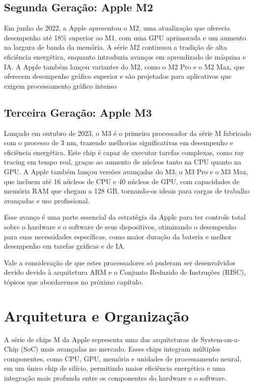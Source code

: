 \documentclass[a4paper,times,12pt]{article}
\begin{document}
\subsection{Segunda Geração: Apple M2}
\hspace{+15pt} 
Em junho de 2022, a Apple apresentou o M2, uma atualização que oferecia desempenho até 18\% superior ao M1, com uma GPU aprimorada e um aumento na largura de banda da memória. A série M2 continuou a tradição de alta eficiência energética, enquanto introduzia avanços em aprendizado de máquina e IA. A Apple também lançou variantes do M2, como o M2 Pro e o M2 Max, que oferecem desempenho gráfico superior e são projetados para aplicativos que exigem processamento gráfico intenso
\subsection{Terceira Geração: Apple M3}
\hspace{+15pt}
Lançado em outubro de 2023, o M3 é o primeiro processador da série M fabricado com o processo de 3 nm, trazendo melhorias significativas em desempenho e eficiência energética. Este chip é capaz de executar tarefas complexas, como ray tracing em tempo real, graças ao aumento de núcleos tanto na CPU quanto na GPU. A Apple também lançou versões avançadas do M3, o M3 Pro e o M3 Max, que incluem até 16 núcleos de CPU e 40 núcleos de GPU, com capacidades de memória RAM que chegam a 128 GB, tornando-os ideais para cargas de trabalho avançadas e uso profissional.

Esse avanço é uma parte essencial da estratégia da Apple para ter controle total sobre o hardware e o software de seus dispositivos, otimizando o desempenho para suas necessidades específicas, como maior duração da bateria e melhor desempenho em tarefas gráficas e de IA. 

Vale a consideração de que estes processadores só puderam ser desenvolvidos devido devido à arquitetura ARM e o Conjunto Reduzido de Instruções (RISC), tópicos que abordaremos no próximo capítulo.

\section{Arquitetura e Organização}
\hspace{+15pt} A série de chips M da Apple representa uma das arquiteturas de System-on-a-Chip (SoC) mais avançadas no mercado. Esses chips integram múltiplos componentes, como CPU, GPU, memória e unidades de processamento neural, em um único chip de silício, permitindo maior eficiência energética e uma integração mais profunda entre os componentes do hardware e o software.
\end{document}
